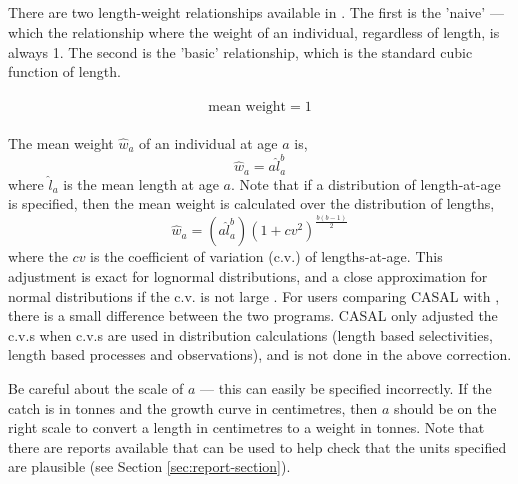 \subsection{\label{sec:mean-weight}}

There are two length-weight relationships available in \CNAME. The first is the 'naive' --- which the relationship where the weight of an individual, regardless of length, is always 1. The second is the 'basic' relationship, which is the standard cubic function of length.

\paragraph[None]{}

  \begin{equation}
    \text{mean weight}=1
  \end{equation}

\paragraph[Basic]{}

The mean weight $\hat{w}_a$ of an individual at age $a$ is,
  \begin{equation}
    \hat{w}_a=a \hat{l}_a^b
  \end{equation}
	where $\hat{l}_a$ is the mean length at age $a$. Note that if a distribution of length-at-age is specified, then the mean weight is calculated over the distribution of lengths,
  \begin{equation}
	  \hat{w}_a=(a\hat{l}_a^b)(1+cv^2)^{\frac{b(b-1)}{2}}
  \end{equation}
	where the $cv$ is the coefficient of variation (c.v.) of lengths-at-age. This adjustment is exact for lognormal distributions, and a close approximation for normal distributions if the c.v. is not large \citep{1388}. For users comparing CASAL with \CNAME, there is a small difference between the two programs. CASAL only adjusted the c.v.s  when c.v.s are used in distribution calculations (length based selectivities, length based processes and observations), and is not done in the above correction.


Be careful about the scale of $a$ --- this can easily be specified incorrectly. If the catch is in tonnes and the growth curve in centimetres, then $a$ should be on the right scale to convert a length in centimetres to a weight in tonnes. Note that there are reports available that can be used to help check that the units specified are plausible (see Section \ref{sec:report-section}).

